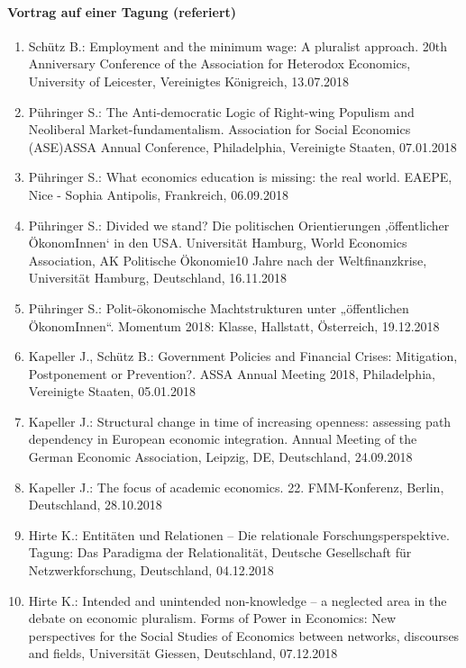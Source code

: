 \paragraph{Vortrag auf einer Tagung (referiert)}
\begin{enumerate}
	\item Schütz B.: Employment and the minimum wage: A pluralist approach. 20th Anniversary Conference of the Association for Heterodox Economics, University of Leicester, Vereinigtes Königreich, 13.07.2018
	\item Pühringer S.: The Anti-democratic Logic of Right-wing Populism and Neoliberal Market-fundamentalism. Association for Social Economics (ASE)ASSA Annual Conference, Philadelphia, Vereinigte Staaten, 07.01.2018
	\item Pühringer S.: What economics education is missing: the real world. EAEPE, Nice - Sophia Antipolis, Frankreich, 06.09.2018
	\item Pühringer S.: Divided we stand? Die politischen Orientierungen ‚öffentlicher ÖkonomInnen‘ in den USA. Universität Hamburg, World Economics Association, AK Politische Ökonomie10 Jahre nach der Weltfinanzkrise, Universität Hamburg, Deutschland, 16.11.2018
	\item Pühringer S.: Polit-ökonomische Machtstrukturen unter „öffentlichen ÖkonomInnen“. Momentum 2018: Klasse, Hallstatt, Österreich, 19.12.2018
	\item Kapeller J., Schütz B.: Government Policies and Financial Crises: Mitigation, Postponement or Prevention?. ASSA Annual Meeting 2018, Philadelphia, Vereinigte Staaten, 05.01.2018
	\item Kapeller J.: Structural change in time of increasing openness: assessing path dependency in European economic integration. Annual Meeting of the German Economic Association, Leipzig, DE, Deutschland, 24.09.2018
	\item Kapeller J.: The focus of academic economics. 22. FMM-Konferenz, Berlin, Deutschland, 28.10.2018
	\item Hirte K.: Entitäten und Relationen – Die relationale Forschungsperspektive. Tagung: Das Paradigma der Relationalität, Deutsche Gesellschaft für Netzwerkforschung, Deutschland, 04.12.2018
	\item Hirte K.: Intended and unintended non-knowledge – a neglected area in the debate on economic pluralism. Forms of Power in Economics: New perspectives for the Social Studies of Economics between networks, discourses and fields, Universität Giessen, Deutschland, 07.12.2018

\end{enumerate}
